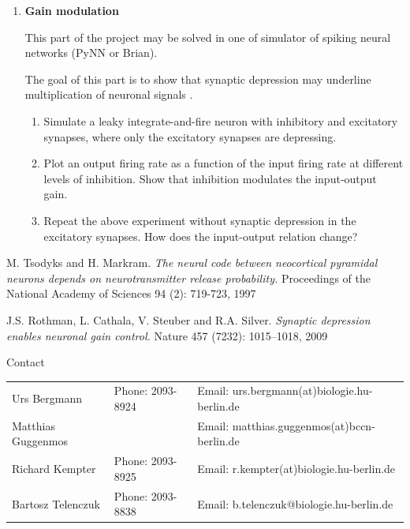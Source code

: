 \documentclass[12pt]{article}
\begin{document}
\begin{enumerate}
    \item \textbf{Gain modulation}

        This part of the project may be solved in one of simulator of
        spiking neural networks (PyNN or Brian).

The goal of this part is to show that synaptic depression may
underline multiplication of neuronal signals \citep{Rothman09}.

\begin{enumerate}
\item Simulate a leaky integrate-and-fire neuron with inhibitory and
    excitatory synapses, where only the excitatory synapses are
    depressing.

\item Plot an output firing rate as a function of the input firing
    rate at different levels of inhibition. Show that inhibition
    modulates the input-output gain.

\item Repeat the above experiment without synaptic depression in the
    excitatory synapses. How
    does the input-output relation change?
\end{enumerate}


\end{enumerate}


\begin{thebibliography}{9}

      M. Tsodyks and H. Markram. \emph{The neural code between neocortical
      pyramidal neurons depends on neurotransmitter release
      probability.} Proceedings of the National Academy of Sciences
      94 (2): 719-723, 1997

       J.S. Rothman, L. Cathala, V. Steuber  and R.A. Silver.
       \emph{Synaptic depression enables neuronal gain control.} Nature
       457 (7232): 1015--1018, 2009
      \end{thebibliography}


\vfill
\centerline{\CAP Contact} \CAP

\begin{tabular}{lll}
Urs Bergmann & Phone: 2093-8924 & Email:
urs.bergmann(at)biologie.hu-berlin.de \\
Matthias Guggenmos & & Email: matthias.guggenmos(at)bccn-berlin.de \\
Richard Kempter \hfill & Phone: 2093-8925 \hfill & Email:
r.kempter(at)biologie.hu-berlin.de \\
Bartosz Telenczuk & Phone: 2093-8838 &
Email: b.telenczuk@biologie.hu-berlin.de \\
\end{tabular}
\end{document}
